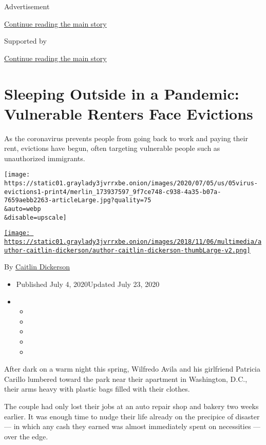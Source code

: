 Advertisement

\protect\hyperlink{after-top}{Continue reading the main story}

Supported by

\protect\hyperlink{after-sponsor}{Continue reading the main story}

\hypertarget{sleeping-outside-in-a-pandemic-vulnerable-renters-face-evictions}{%
\section{Sleeping Outside in a Pandemic: Vulnerable Renters Face
Evictions}\label{sleeping-outside-in-a-pandemic-vulnerable-renters-face-evictions}}

As the coronavirus prevents people from going back to work and paying
their rent, evictions have begun, often targeting vulnerable people such
as unauthorized immigrants.

\texttt{[image: https://static01.graylady3jvrrxbe.onion/images/2020/07/05/us/05virus-evictions1-print4/merlin\_173937597\_9f7ce748-c938-4a35-b07a-7659aebb2263-articleLarge.jpg?quality=75\\\&auto=webp\\\&disable=upscale]}

\href{https://www.nytimes3xbfgragh.onion/by/caitlin-dickerson}{\texttt{[image: https://static01.graylady3jvrrxbe.onion/images/2018/11/06/multimedia/author-caitlin-dickerson/author-caitlin-dickerson-thumbLarge-v2.png]}}

By
\href{https://www.nytimes3xbfgragh.onion/by/caitlin-dickerson}{Caitlin
Dickerson}

\begin{itemize}
\item
  Published July 4, 2020Updated July 23, 2020
\item
  \begin{itemize}
  \item
  \item
  \item
  \item
  \item
  \end{itemize}
\end{itemize}

After dark on a warm night this spring, Wilfredo Avila and his
girlfriend Patricia Carillo lumbered toward the park near their
apartment in Washington, D.C., their arms heavy with plastic bags filled
with their clothes.

The couple had only lost their jobs at an auto repair shop and bakery
two weeks earlier. It was enough time to nudge their life already on the
precipice of disaster --- in which any cash they earned was almost
immediately spent on necessities --- over the edge.

